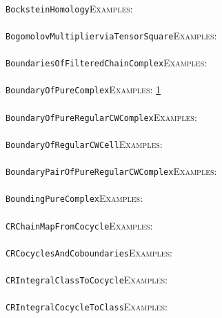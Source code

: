 \documentclass[a4paper,11pt]{report}
\begin{document}
{{ \\
 \texttt{BocksteinHomology}{\nobreakspace}{\nobreakspace}{\nobreakspace}{\nobreakspace}\textsc{Examples:} \\
 \\
 \texttt{BogomolovMultiplier{\textunderscore}viaTensorSquare}{\nobreakspace}{\nobreakspace}{\nobreakspace}{\nobreakspace}\textsc{Examples:} \\
 \\
 \texttt{BoundariesOfFilteredChainComplex}{\nobreakspace}{\nobreakspace}{\nobreakspace}{\nobreakspace}\textsc{Examples:} \\
 \\
 \texttt{BoundaryOfPureComplex}{\nobreakspace}{\nobreakspace}{\nobreakspace}{\nobreakspace}\textsc{Examples:} \href{../www/SideLinks/About/aboutPeripheral.html} {1}{\nobreakspace} \\
 \\
 \texttt{BoundaryOfPureRegularCWComplex}{\nobreakspace}{\nobreakspace}{\nobreakspace}{\nobreakspace}\textsc{Examples:} \\
 \\
 \texttt{BoundaryOfRegularCWCell}{\nobreakspace}{\nobreakspace}{\nobreakspace}{\nobreakspace}\textsc{Examples:} \\
 \\
 \texttt{BoundaryPairOfPureRegularCWComplex}{\nobreakspace}{\nobreakspace}{\nobreakspace}{\nobreakspace}\textsc{Examples:} \\
 \\
 \texttt{BoundingPureComplex}{\nobreakspace}{\nobreakspace}{\nobreakspace}{\nobreakspace}\textsc{Examples:} \\
 \\
 \texttt{CR{\textunderscore}ChainMapFromCocycle}{\nobreakspace}{\nobreakspace}{\nobreakspace}{\nobreakspace}\textsc{Examples:} \\
 \\
 \texttt{CR{\textunderscore}CocyclesAndCoboundaries}{\nobreakspace}{\nobreakspace}{\nobreakspace}{\nobreakspace}\textsc{Examples:} \\
 \\
 \texttt{CR{\textunderscore}IntegralClassToCocycle}{\nobreakspace}{\nobreakspace}{\nobreakspace}{\nobreakspace}\textsc{Examples:} \\
 \\
 \texttt{CR{\textunderscore}IntegralCocycleToClass}{\nobreakspace}{\nobreakspace}{\nobreakspace}{\nobreakspace}\textsc{Examples:} \\
 \\
}}
\end{document}
